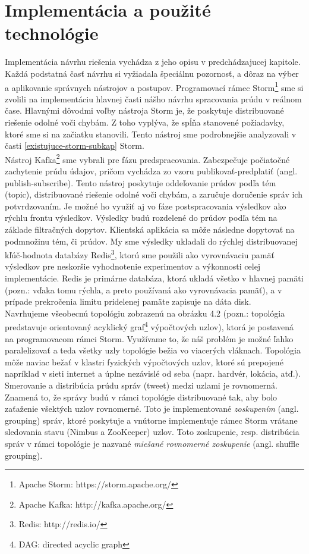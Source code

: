 \section{Implementácia a použité technológie}
Implementácia návrhu riešenia vychádza z jeho opisu v predchádzajucej kapitole. Každá podstatná časť návrhu si vyžiadala špeciálnu pozornosť, a dôraz na výber a aplikovanie správnych nástrojov a postupov. Programovací rámec Storm\footnote{Apache Storm: https://storm.apache.org/} sme si zvolili na implementáciu hlavnej časti nášho návrhu spracovania prúdu v reálnom čase. Hlavnými dôvodmi voľby nástroja Storm je, že poskytuje distribuované riešenie odolné voči chybám. Z toho vyplýva, že spĺňa stanovené požiadavky, ktoré sme si na začiatku stanovili. Tento nástroj sme podrobnejšie analyzovali v časti \ref{existujuce-storm-subkap} Storm. 
\\[5pt]
Nástroj Kafka\footnote{Apache Kafka: http://kafka.apache.org/} sme vybrali pre fázu predspracovania. Zabezpečuje počiatočné zachytenie prúdu údajov, pričom vychádza zo vzoru publikovať-predplatiť (angl. publish-subscribe). Tento nástroj poskytuje oddeľovanie prúdov podľa tém (topic), distribuované riešenie odolné voči chybám, a zaručuje doručenie správ ich potvrdzovaním. Je možné ho využiť aj vo fáze postspracovania výsledkov ako rýchlu frontu výsledkov. Výsledky budú rozdelené do prúdov podľa tém na základe filtračných dopytov. Klientská aplikácia sa môže následne dopytovať na podmnožinu tém, či prúdov. My sme výsledky ukladali do rýchlej distribuovanej kľúč-hodnota databázy Redis\footnote{Redis: http://redis.io/}, ktorú sme použili ako vyrovnávaciu pamäť výsledkov pre neskoršie vyhodnotenie experimentov a výkonnosti celej implementácie. Redis je primárne databáza, ktorá ukladá všetko v hlavnej pamäti (pozn.: vďaka tomu rýchla, a preto používaná ako vyrovnávacia pamäť), a v prípade prekročenia limitu pridelenej pamäte zapisuje na dáta disk. 
\\[5pt]
Navrhujeme všeobecnú topológiu zobrazenú na obrázku 4.2 (pozn.: topológia predstavuje orientovaný acyklický graf\footnote{DAG: directed acyclic graph} výpočtových uzlov), ktorá je postavená na programovacom rámci Storm. Využívame to, že náš problém je možné ľahko paralelizovať a teda všetky uzly topológie bežia vo viacerých vláknach. Topológia môže naviac bežať v klastri fyzických výpočtových uzlov, ktoré sú prepojené napríklad v sieti internet a úplne nezávislé od seba (napr. hardvér, lokácia, atď.). 
\\[5pt]
Smerovanie a distribúcia prúdu správ (tweet) medzi uzlami je rovnomerná. Znamená to, že správy budú v rámci topológie distribuované tak, aby bolo zaťaženie všektých uzlov rovnomerné. Toto je implementované \textit{zoskupením} (angl. grouping) správ, ktoré poskytuje a vnútorne implementuje rámec Storm vrátane sledovania stavu (Nimbus a ZooKeeper) uzlov. Toto zoskupenie, resp. distribúcia správ v rámci topológie je nazvané \textit{miešané rovnomerné zoskupenie} (angl. shuffle grouping).
